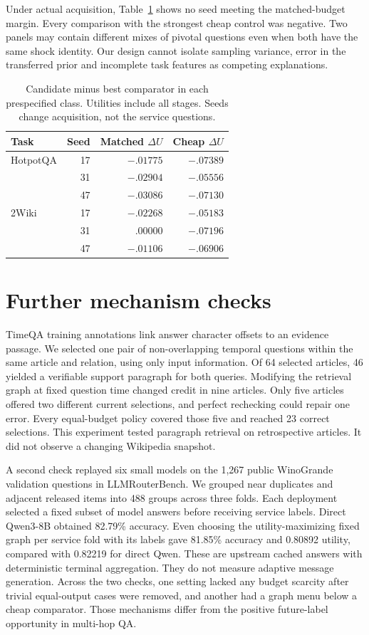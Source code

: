 \documentclass[11pt]{article}
\begin{document}
Under actual acquisition, Table~\ref{tab:paid} shows no seed meeting the matched-budget margin. Every comparison with the strongest cheap control was negative. Two panels may contain different mixes of pivotal questions even when both have the same shock identity. Our design cannot isolate sampling variance, error in the transferred prior and incomplete task features as competing explanations.
\begin{table}[t]\centering\small
\begin{tabular}{lrrr}\toprule Task & Seed & Matched $\Delta U$ & Cheap $\Delta U$\\\midrule
HotpotQA &17&$-.01775$&$-.07389$\\&31&$-.02904$&$-.05556$\\&47&$-.03086$&$-.07130$\\\addlinespace
2Wiki &17&$-.02268$&$-.05183$\\&31&$.00000$&$-.07196$\\&47&$-.01106$&$-.06906$\\\bottomrule\end{tabular}
\caption{Candidate minus best comparator in each prespecified class. Utilities include all stages. Seeds change acquisition, not the service questions.}\label{tab:paid}\end{table}

\section{Further mechanism checks}
TimeQA training annotations link answer character offsets to an evidence passage. We selected one pair of non-overlapping temporal questions within the same article and relation, using only input information. Of 64 selected articles, 46 yielded a verifiable support paragraph for both queries. Modifying the retrieval graph at fixed question time changed credit in nine articles. Only five articles offered two different current selections, and perfect rechecking could repair one error. Every equal-budget policy covered those five and reached 23 correct selections. This experiment tested paragraph retrieval on retrospective articles. It did not observe a changing Wikipedia snapshot.

A second check replayed six small models on the 1,267 public WinoGrande validation questions in LLMRouterBench. We grouped near duplicates and adjacent released items into 488 groups across three folds. Each deployment selected a fixed subset of model answers before receiving service labels. Direct Qwen3-8B obtained 82.79\% accuracy. Even choosing the utility-maximizing fixed graph per service fold with its labels gave 81.85\% accuracy and 0.80892 utility, compared with 0.82219 for direct Qwen. These are upstream cached answers with deterministic terminal aggregation. They do not measure adaptive message generation. Across the two checks, one setting lacked any budget scarcity after trivial equal-output cases were removed, and another had a graph menu below a cheap comparator. Those mechanisms differ from the positive future-label opportunity in multi-hop QA.
\end{document}

